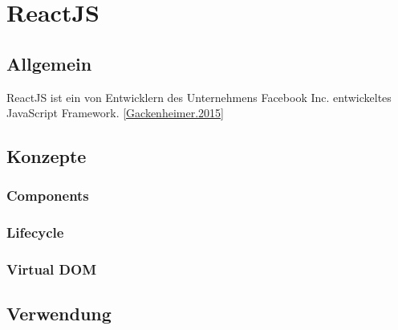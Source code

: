 \chapter{ReactJS}

\section{Allgemein}


ReactJS ist ein von Entwicklern des Unternehmens Facebook Inc. entwickeltes JavaScript Framework. \autoref{Gackenheimer.2015} 


%



\section{Konzepte}

\subsection{Components}



\subsection{Lifecycle}

\subsection{Virtual DOM}

\section{Verwendung}


